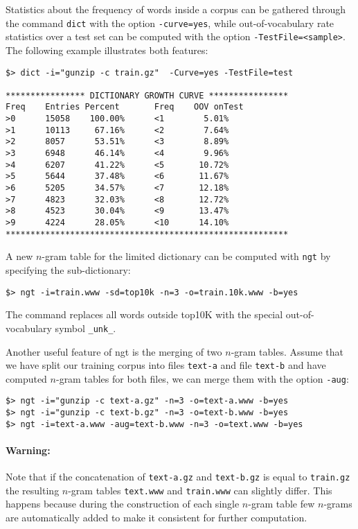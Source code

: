 \documentclass[11pt]{article}
\begin{document}
\noindent
Statistics about the frequency of words inside a corpus can be gathered through  the command {\tt dict}
with the option {\tt -curve=yes}, while out-of-vocabulary rate statistics over a test set can be computed with
the option {\tt -TestFile=<sample>}.  The following example illustrates both features:
\begin{verbatim}
$> dict -i="gunzip -c train.gz"  -Curve=yes -TestFile=test

**************** DICTIONARY GROWTH CURVE ****************
Freq    Entries Percent       Freq    OOV onTest
>0      15058    100.00%      <1        5.01%
>1      10113     67.16%      <2        7.64%
>2      8057      53.51%      <3        8.89%
>3      6948      46.14%      <4        9.96%
>4      6207      41.22%      <5       10.72%
>5      5644      37.48%      <6       11.67%
>6      5205      34.57%      <7       12.18%
>7      4823      32.03%      <8       12.72%
>8      4523      30.04%      <9       13.47%
>9      4224      28.05%      <10      14.10%
*********************************************************

\end{verbatim}

\noindent
A new  $n$-gram table for the  limited dictionary can  be computed with {\tt ngt} by specifying 
the sub-dictionary:
\begin{verbatim}
$> ngt -i=train.www -sd=top10k -n=3 -o=train.10k.www -b=yes
\end{verbatim}
The command replaces  all words outside  top10K with  the special
out-of-vocabulary symbol {\tt \_unk\_}.

\noindent
Another useful feature of ngt is the merging of two $n$-gram tables. Assume that we have 
split our training corpus into files  {\tt text-a} and file {\tt text-b} and have computed $n$-gram 
tables for both files, we can merge them with the option {\tt -aug}:
\begin{verbatim}
$> ngt -i="gunzip -c text-a.gz" -n=3 -o=text-a.www -b=yes
$> ngt -i="gunzip -c text-b.gz" -n=3 -o=text-b.www -b=yes
$> ngt -i=text-a.www -aug=text-b.www -n=3 -o=text.www -b=yes
\end{verbatim}

\paragraph{Warning:} Note that if the concatenation of {\tt text-a.gz} and {\tt text-b.gz} is equal to {\tt train.gz} the resulting $n$-gram tables
{\tt text.www} and {\tt train.www} can slightly differ. This happens because during the construction of each single $n$-gram table few $n$-grams are automatically added to make it consistent for further computation.
\end{document}
